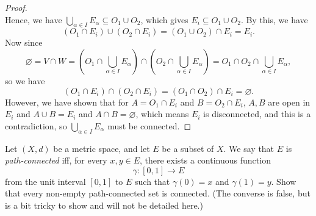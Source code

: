 \begin{proof}
\[    \]  Hence, we have \(\bigcup_{\alpha \in I} E_\alpha \subseteq O_1 \cup O_2\), which gives \(E_i \subseteq O_1 \cup O_2\). By this, we have
    \[
        (O_1 \cap E_i) \cup (O_2 \cap E_i) = (O_1 \cup O_2) \cap E_i = E_i.
    \]
    Now since 
    \[
        \varnothing = V \cap W = \left( O_1 \cap \bigcup_{\alpha \in I} E_\alpha \right) \cap \left( O_2 \cap \bigcup_{\alpha \in I} E_\alpha \right) = O_1 \cap O_2 \cap \bigcup_{\alpha \in I} E_\alpha, 
    \] so we have 
    \[
        \left( O_1 \cap E_i \right) \cap (O_2 \cap E_i)  = \left( O_1 \cap O_2 \right) \cap E_i = \varnothing. 
    \] However, we have shown that for \(A = O_1 \cap E_i\) and \(B = O_2 \cap E_i\), \(A, B\) are open in \(E_i\) and \(A \cup B = E_i\) and \(A \cap B = \varnothing \), which means \(E_i\) is disconnected, and this is a contradiction, so \(\bigcup_{\alpha \in I} E_\alpha\) must be connected.       
\end{proof}

\begin{problem}[20pts]
    Let $(X,d)$ be a metric space, and let $E$ be a subset of $X$.  
We say that $E$ is \emph{path-connected} iff, for every $x,y \in E$, there exists a continuous function  
\[
\gamma : [0,1] \to E
\]
from the unit interval $[0,1]$ to $E$ such that $\gamma(0)=x$ and $\gamma(1)=y$.  
Show that every non-empty path-connected set is connected.  
(The converse is false, but is a bit tricky to show and will not be detailed here.)
\end{problem}

